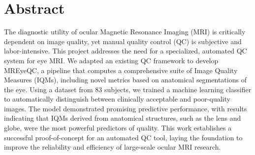 
\chapter*{Abstract}
\minitoc
The diagnostic utility of ocular Magnetic Resonance Imaging (MRI) is critically dependent on image quality, yet manual quality control (QC) is subjective and labor-intensive. This project addresses the need for a specialized, automated QC system for eye MRI. We adapted an existing QC framework to develop MREyeQC, a pipeline that computes a comprehensive suite of Image Quality Measures (IQMs), including novel metrics based on anatomical segmentations of the eye. Using a dataset from 83 subjects, we trained a machine learning classifier to automatically distinguish between clinically acceptable and poor-quality images. The model demonstrated promising predictive performance, with results indicating that IQMs derived from anatomical structures, such as the lens and globe, were the most powerful predictors of quality. This work establishes a successful proof-of-concept for an automated QC tool, laying the foundation to improve the reliability and efficiency of large-scale ocular MRI research.



